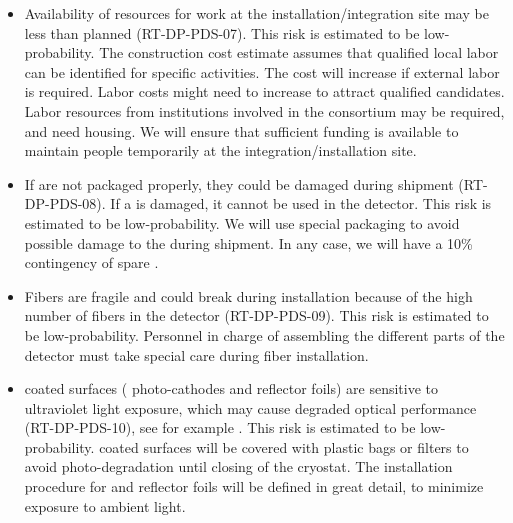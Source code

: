 \begin{itemize}

\item Availability of resources for work at the installation/integration site may be less than planned (RT-DP-PDS-07). This risk is estimated to be low-probability. The  construction cost estimate assumes that qualified local labor can be identified for %
specific activities.  The cost will increase if external labor is required.  Labor costs might need to increase to attract qualified candidates. %
Labor resources from institutions involved in the  consortium %
may be required, and need housing. We will ensure that sufficient funding is available to maintain  people temporarily %
at the integration/installation site.

\item If  are not packaged properly, they could be damaged during shipment (RT-DP-PDS-08). If a  is damaged, it cannot be used in the detector. This risk is estimated to be low-probability. We will use special packaging to avoid possible damage to the  during shipment. In any case, we will have a \num{10}\% contingency of spare .

\item Fibers are fragile and could break during installation because of the high number of fibers in the detector (RT-DP-PDS-09). This risk is estimated to be low-probability. Personnel in charge of assembling the different parts of the detector must take special care during fiber installation.

\item {} coated surfaces ( photo-cathodes and  reflector foils) are sensitive to ultraviolet light exposure, which may cause degraded optical performance (RT-DP-PDS-10), see for example \cite{Jones:2012hm}. This risk is estimated to be low-probability.  coated surfaces will be covered with plastic bags or filters to avoid photo-degradation until closing of the cryostat. The installation procedure for  and  reflector foils will be defined in great detail, to minimize exposure to ambient light. 

\end{itemize}


